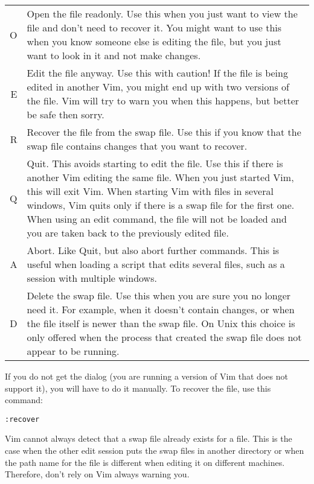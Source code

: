 \begin{center} \begin{tabularx}{\textwidth}{r X}
				O &  Open the file readonly.
				Use this when you just want to view the file and don't need to recover it.
				You might want to use this when you know someone else is editing the file, but you just want to look in it and not make changes. \\

				E & Edit the file anyway.
				Use this with caution!  If the file is being edited in another Vim, you might end up with two versions of the file.
				Vim will try to warn you when this happens, but better be safe then sorry. \\

				R & Recover the file from the swap file.
				Use this if you know that the swap file contains changes that you want to recover. \\

				Q & Quit.
				This avoids starting to edit the file.
				Use this if there is another Vim editing the same file.
				When you just started Vim, this will exit Vim.
				When starting Vim with files in several windows, Vim quits only if there is a swap file for the first one.
				When using an edit command, the file will not be loaded and you are taken back to the previously edited file. \\

				A & Abort.
				Like Quit, but also abort further commands.
				This is useful when loading a script that edits several files, such as a session with multiple windows. \\

				D &  Delete the swap file.
				Use this when you are sure you no longer need it.
				For example, when it doesn't contain changes, or when the file itself is newer than the swap file.
				On Unix this choice is only offered when the process that created the swap file does not appear to be running. \\ 
\end{tabularx} \end{center}

If you do not get the dialog (you are running a version of Vim that does not support it), you will have to do it manually.
To recover the file, use this command:

\begin{Verbatim}[samepage=true]
 :recover
\end{Verbatim}

Vim cannot always detect that a swap file already exists for a file.
This is the case when the other edit session puts the swap files in another directory or when the path name for the file is different when editing it on different machines.
Therefore, don't rely on Vim always warning you.

